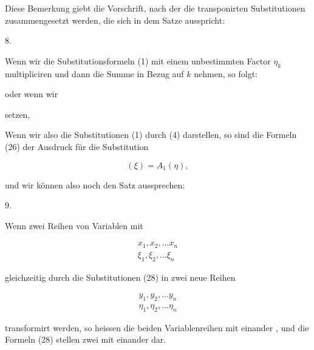 Diese Bemerkung giebt die Vorschrift, nach der die transponirten Substitutionen zusammengesetzt werden, die sich in dem Satze ausspricht:

\par
8.\enspace{}


Wenn wir die Substitutionsformeln (1) mit einem unbestimmten Factor $\eta_k$ multipliciren und dann die Summe in Bezug auf $k$ nehmen, so folgt:


oder wenn wir


setzen,


Wenn wir also die Substitutionen (1) durch (4) darstellen, so sind die Formeln (26) der Ausdruck für die Substitution

\[
(\xi) = A_1(\eta),
\]

und wir können also noch den Satz aussprechen:

\par
9.\enspace{}




Wenn zwei Reihen von Variablen mit

\[
\begin{gathered} x_1, x_2, \ldots x_n \\ \xi_1, \xi_2, \ldots \xi_n \end{gathered}
\]

gleichzeitig durch die Substitutionen (28) in zwei neue Reihen

\[
\begin{gathered} y_1, y_2, \ldots y_n \\ \eta_1, \eta_2, \ldots \eta_n \end{gathered}
\]

transformirt werden, so heissen die beiden Variablenreihen mit einander , und die Formeln (28) stellen zwei mit einander  dar.
